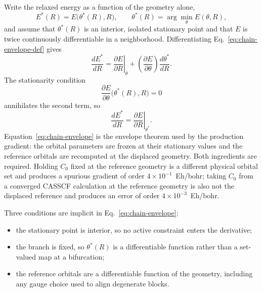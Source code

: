 Write the relaxed energy as a function of the geometry alone,
\begin{equation}
  E^{*}(R) = E\bigl(\theta^{*}(R),R\bigr),
  \qquad
  \theta^{*}(R) = \arg\min_{\theta} E(\theta,R),
  \label{eq:chain-envelope-def}
\end{equation}
and assume that $\theta^{*}(R)$ is an interior, isolated stationary
point and that $E$ is twice continuously differentiable in a
neighborhood.  Differentiating Eq.~\eqref{eq:chain-envelope-def} gives
\begin{equation}
  \frac{dE^{*}}{dR}
  = \left.\frac{\partial E}{\partial R}\right|_{\theta}
  + \left(\frac{\partial E}{\partial\theta}\right)
    \frac{d\theta^{*}}{dR}.
  \label{eq:chain-envelope-raw}
\end{equation}
The stationarity condition
\begin{equation}
  \frac{\partial E}{\partial\theta}\bigl(\theta^{*}(R),R\bigr)=0
  \label{eq:chain-stationarity}
\end{equation}
annihilates the second term, so
\begin{equation}
  \frac{dE^{*}}{dR}
  = \left.\frac{\partial E}{\partial R}\right|_{\theta^{*}}.
  \label{eq:chain-envelope}
\end{equation}
Equation~\eqref{eq:chain-envelope} is the envelope theorem used by the
production gradient: the orbital parameters are frozen at their
stationary values and the reference orbitals are recomputed at the
displaced geometry.  Both ingredients are required.  Holding $C_0$
fixed at the reference geometry is a different physical orbital set and
produces a spurious gradient of order $4\times10^{-1}$~Eh/bohr; taking
$C_0$ from a converged CASSCF calculation at the reference geometry is
also not the displaced reference and produces an error of order
$4\times10^{-3}$~Eh/bohr.

Three conditions are implicit in Eq.~\eqref{eq:chain-envelope}:

\begin{itemize}
\item the stationary point is interior, so no active constraint enters
  the derivative;
\item the branch is fixed, so $\theta^{*}(R)$ is a differentiable
  function rather than a set-valued map at a bifurcation;
\item the reference orbitals are a differentiable function of the
  geometry, including any gauge choice used to align degenerate blocks.
\end{itemize}

